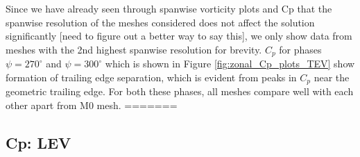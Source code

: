 Since we have already seen through spanwise vorticity plots and Cp that the spanwise resolution of the meshes considered does not affect the solution significantly [need to figure out a better way to say this], we only show data from meshes with the 2nd highest spanwise resolution for brevity. $C_p$ for phases $\psi=270^\circ$ and $\psi=300^\circ$ which is shown in Figure \ref{fig:zonal_Cp_plots_TEV} show formation of trailing edge separation, which is evident from peaks in $C_p$ near the geometric trailing edge. For both these phases, all meshes compare well with each other apart from M0 mesh.
=======


\subsection{Cp: LEV}
\begin{figure}[H]
\centering


\end{figure}
